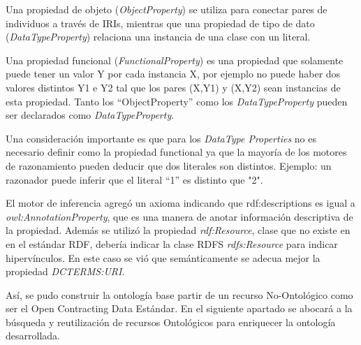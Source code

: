 Una propiedad de objeto (\textit{ObjectProperty}) se utiliza para conectar pares de individuos a través de IRIs, mientras que una propiedad de tipo de dato (\textit{DataTypeProperty}) relaciona una instancia de una clase con un literal.

Una propiedad funcional (\textit{FunctionalProperty}) es una propiedad que solamente puede tener un valor Y por cada instancia X, por ejemplo no puede haber dos valores distintos Y1 e Y2 tal que los pares (X,Y1) y (X,Y2) sean instancias de esta propiedad. Tanto los “ObjectProperty” como los \textit{DataTypeProperty} pueden ser declarados como \textit{DataTypeProperty}.


Una consideración importante es que para los \textit{DataType Properties} no es necesario definir como la propiedad functional ya que la mayoría de los motores de razonamiento pueden deducir que dos literales son distintos. Ejemplo: un razonador puede inferir que  el literal “1” es distinto que  "2".

El motor de inferencia agregó un axioma indicando que rdf:descriptions es igual a \textit{owl:AnnotationProperty}, que es una manera de anotar información descriptiva de la propiedad. Además se utilizó la propiedad \textit{rdf:Resource}, clase que no existe en en el estándar RDF, debería indicar la clase RDFS \textit{ rdfs:Resource} para indicar hipervínculos. En este caso se vió que semánticamente se adecua mejor la propiedad \textit{DCTERMS:URI}.

Así, se pudo construir la ontología base partir de un recurso No-Ontológico como ser el Open Contracting Data Estándar. En el siguiente apartado se abocará a la búsqueda y reutilización de recursos Ontológicos para enriquecer la ontología desarrollada.
